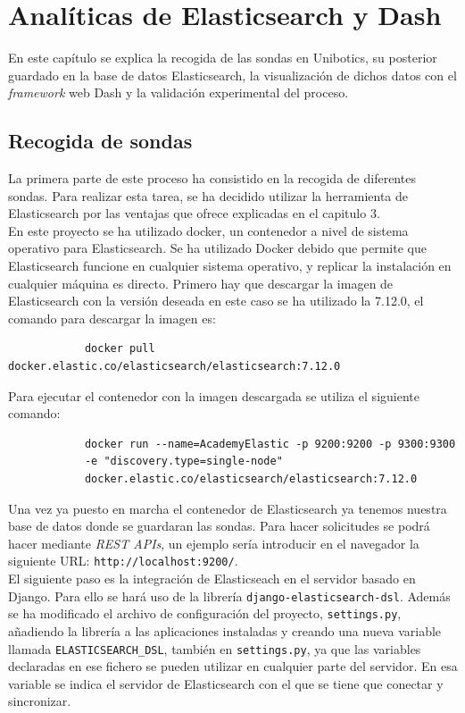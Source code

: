 \chapter{Analíticas de Elasticsearch y Dash}
\label{analiticas}
En este capítulo se explica la recogida de las sondas en Unibotics, su posterior guardado en la base de datos Elasticsearch, la visualización de dichos datos con el \textit{framework} web Dash y la validación experimental del proceso.
\section{Recogida de sondas}
La primera parte de este proceso ha consistido en la recogida de diferentes sondas. Para realizar esta tarea, se ha decidido utilizar la herramienta de Elasticsearch por las ventajas que ofrece explicadas en el capitulo 3.\\

En este proyecto se ha utilizado docker, un contenedor a nivel de sistema operativo para Elasticsearch. Se ha utilizado Docker debido que permite que Elasticsearch funcione en cualquier sistema operativo, y replicar la instalación en cualquier máquina es directo. Primero hay que descargar la imagen de Elasticsearch con la versión deseada en este caso se ha utilizado la 7.12.0, el comando para descargar la imagen es:
{\footnotesize
		\begin{verbatim}
			docker pull docker.elastic.co/elasticsearch/elasticsearch:7.12.0
		\end{verbatim}
		}
        
Para ejecutar el contenedor con la imagen descargada se utiliza el siguiente comando:

{\footnotesize
		\begin{verbatim}
			docker run --name=AcademyElastic -p 9200:9200 -p 9300:9300
            -e "discovery.type=single-node" 
            docker.elastic.co/elasticsearch/elasticsearch:7.12.0
		\end{verbatim}
		}
   \newpage   
  Una vez ya puesto en marcha el contenedor de Elasticsearch ya tenemos nuestra base de datos donde se guardaran las sondas. Para hacer solicitudes se podrá hacer mediante \textit{REST APIs}, un ejemplo sería introducir en el navegador la siguiente URL: \texttt{http://localhost:9200/}.\\
  
  El siguiente paso es la integración de Elasticseach en el servidor basado en Django. Para ello se hará uso de la librería \texttt{django-elasticsearch-dsl}. Además se ha modificado el archivo de configuración del proyecto, \texttt{settings.py},  añadiendo la librería a las aplicaciones instaladas y creando una nueva variable llamada \texttt{ELASTICSEARCH\_DSL}, también en \texttt{settings.py}, ya que las variables declaradas en ese fichero se pueden utilizar en cualquier parte del servidor. En esa variable se indica el servidor de Elasticsearch con el que se tiene que conectar y sincronizar.\\
  
